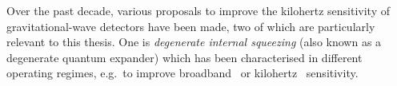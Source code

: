 Over the past decade, various proposals to improve the kilohertz sensitivity of gravitational-wave detectors have been made, two of which are particularly relevant to this thesis.
One is \emph{degenerate internal squeezing} (also known as a degenerate quantum expander) %
which has been characterised in different operating regimes, e.g.\ to improve broadband~\cite{korobkoQuantumExpanderGravitationalwave2019} or kilohertz~\cite{adyaQuantumEnhancedKHz2020} sensitivity. 
